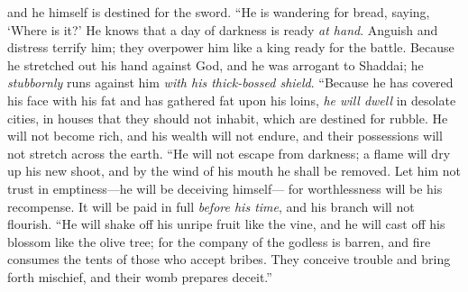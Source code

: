 \begin{biblechapter}
and he himself is destined for the sword.
\verse “He is wandering for bread, saying, ‘Where is it?’ 
He knows that a day of darkness is ready \textit{at hand}.
\verse Anguish and distress terrify him; 
they overpower him like a king ready for the battle.
\verse Because he stretched out his hand against God, 
and he was arrogant to Shaddai;
\verse he \textit{stubbornly} runs against him 
\textit{with his thick-bossed shield}.
\verse “Because he has covered his face with his fat 
and has gathered fat upon his loins,
\verse \textit{he will dwell} in desolate cities, 
in houses that they should not inhabit, 
which are destined for rubble.
\verse He will not become rich, and his wealth will not endure, 
and their possessions will not stretch across the earth.
\verse “He will not escape from darkness; 
a flame will dry up his new shoot, 
and by the wind of his mouth he shall be removed.
\verse Let him not trust in emptiness—he will be deceiving himself— 
for worthlessness will be his recompense.
\verse It will be paid in full \textit{before his time}, 
and his branch will not flourish.
\verse “He will shake off his unripe fruit like the vine, 
and he will cast off his blossom like the olive tree;
\verse for the company of the godless is barren, 
and fire consumes the tents of those who accept bribes.
\verse They conceive trouble and bring forth mischief, 
and their womb prepares deceit.”
\end{biblechapter}

